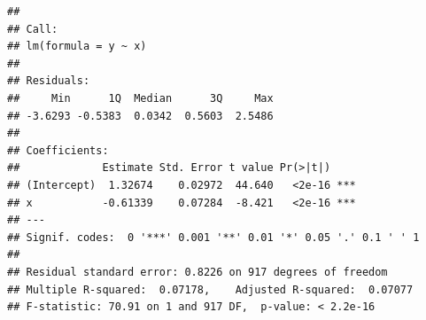\documentclass[ignorenonframetext,]{beamer}
\begin{document}
\begin{frame}[fragile]{}

\begin{verbatim}
## 
## Call:
## lm(formula = y ~ x)
## 
## Residuals:
##     Min      1Q  Median      3Q     Max 
## -3.6293 -0.5383  0.0342  0.5603  2.5486 
## 
## Coefficients:
##             Estimate Std. Error t value Pr(>|t|)    
## (Intercept)  1.32674    0.02972  44.640   <2e-16 ***
## x           -0.61339    0.07284  -8.421   <2e-16 ***
## ---
## Signif. codes:  0 '***' 0.001 '**' 0.01 '*' 0.05 '.' 0.1 ' ' 1
## 
## Residual standard error: 0.8226 on 917 degrees of freedom
## Multiple R-squared:  0.07178,    Adjusted R-squared:  0.07077 
## F-statistic: 70.91 on 1 and 917 DF,  p-value: < 2.2e-16
\end{verbatim}

\end{frame}
\end{document}
